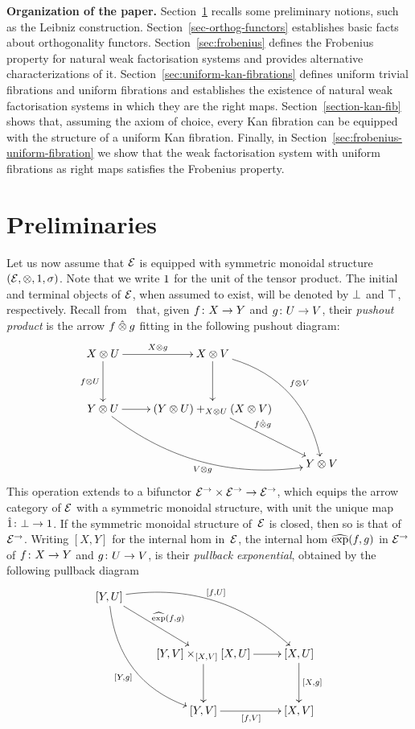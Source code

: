\documentclass[reqno,10pt,a4paper,oneside]{amsart}
\begin{document}
\smallskip

\noindent
\textbf{Organization of the paper.} Section~\ref{sec:preliminaries} recalls some preliminary notions,
such as the Leibniz construction.
Section~\ref{sec-orthog-functors} establishes basic facts about orthogonality functors.
Section~\ref{sec:frobenius} defines the Frobenius property for natural weak factorisation
systems and provides alternative characterizations of it. 
Section~\ref{sec:uniform-kan-fibrations} defines uniform trivial fibrations and uniform fibrations and
establishes the existence of natural weak factorisation systems in which they are the 
right maps.
Section~\ref{section-kan-fib} shows that, assuming the axiom of choice, every Kan fibration
can be equipped with the structure of a uniform Kan fibration.
Finally, in Section~\ref{sec:frobenius-uniform-fibration} we show that the weak factorisation system with
uniform fibrations as right maps satisfies the Frobenius property.


  

 

\section{Preliminaries}
\label{sec:preliminaries}


Let us now assume that $\mathcal{E}$ is equipped with symmetric monoidal structure $(\mathcal{E}, \otimes, 1, \sigma)$.
Note that we write $1$ for the unit of the tensor product. The initial and terminal objects of $\mathcal{E}$, when assumed to exist, will be denoted by $\bot$ and $\top$, respectively. Recall from~\cite[Section 4]{riehl-verity:reedy} that, given $f \colon X \to Y$ and $g \colon U \to V$, their \emph{pushout product} is the arrow $f \mathbin{\hat{\otimes}} g$ fitting in the following pushout diagram:
\[
\xymatrix@R=1.2cm{
X \otimes U \ar[r]^{X \otimes g}  \ar[d]_{f \otimes U} & X \otimes V \ar@/^2pc/[ddr]^{f \otimes V} \ar[d] & \\ 
Y \otimes U \ar@/_2pc/[drr]_{V \otimes g} \ar[r] & (Y \otimes U) +_{X \otimes U} (X \otimes V) \ar[dr]^-(.35){f \hatotimes g}  & \\ 
 & & Y \otimes V} 
 \]
This operation extends to a bifunctor  $\mathcal{E}^{\to} \times \mathcal{E}^{\to} \to \mathcal{E}^{\to}$, which equips the arrow category of $\mathcal{E}$ with a symmetric monoidal structure, with unit the unique map $\hat{1} \colon \bot \to 1$.
If the symmetric
monoidal structure of~$\mathcal{E}$ is closed, then so is that of $\mathcal{E}^\to$. Writing $[X,Y]$ for the internal hom in~$\mathcal{E}$,
the internal hom $\operatorname{\widehat{exp}}(f,g)$ in $\mathcal{E}^\to$ of $f \colon X \to Y$ and $g \colon U \to V$, is their \emph{pullback exponential}, obtained by the following pullback diagram
\[
\xymatrix@R=1.2cm{
[Y, U] \ar@/^2pc/[drr]^{[f,U]} \ar@/_2pc/[ddr]_{[Y,g]}  \ar[dr]^{\hatexp(f,g)} & & \\ 
 & [Y,V] \times_{[X,V]} [X,U]  \ar[d] \ar[r] & [X,U] \ar[d]^{[X,g]} \\
 & [Y,V] \ar[r]_{[f,V]} & [X,V] }
 \]
\end{document}
